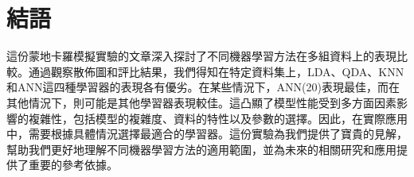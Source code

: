 \section{結語}
這份蒙地卡羅模擬實驗的文章深入探討了不同機器學習方法在多組資料上的表現比較。通過觀察散佈圖和評比結果，我們得知在特定資料集上，LDA、QDA、KNN 和ANN這四種學習器的表現各有優劣。在某些情況下，ANN(20)表現最佳，而在其他情況下，則可能是其他學習器表現較佳。這凸顯了模型性能受到多方面因素影響的複雜性，包括模型的複雜度、資料的特性以及參數的選擇。因此，在實際應用中，需要根據具體情況選擇最適合的學習器。這份實驗為我們提供了寶貴的見解，幫助我們更好地理解不同機器學習方法的適用範圍，並為未來的相關研究和應用提供了重要的參考依據。

